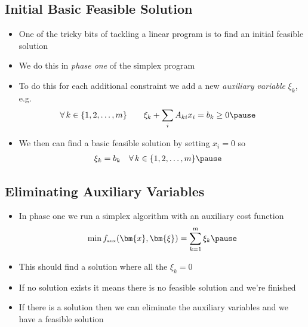 
\begin{slide}
\section[-2]{Initial Basic Feasible Solution}

\begin{PauseHighLight}
  \begin{itemize}
  \item One of the tricky bits of tackling a linear program is to find
    an initial feasible solution\pause
  \item We do this in \emph{phase one} of the simplex program\pause
  \item To do this for each additional constraint we add a new
    \emph{auxiliary variable} $\xi_k$, e.g.
    \begin{align*}
     \forall\, k\in\{1,2,\ldots, m\} \quad\quad
     \xi_k + \sum_i A_{ki} x_i &= b_k  \geq 0 \pause
    \end{align*}
  \item We then can find a basic feasible solution by setting $x_i=0$ so
    \begin{align*}
      \xi_k &= b_k  \quad \forall\, k\in\{1,2,\ldots, m\}\pause
    \end{align*}
  \end{itemize}
\end{PauseHighLight}

\end{slide}


\begin{slide}
\section{Eliminating Auxiliary Variables}

\begin{PauseHighLight}
  \begin{itemize}
  \item In phase one we run a simplex algorithm with an auxiliary cost
    function
    \begin{align*}
      \min f_{\text{\tiny aux}}(\bm{x},\bm{\xi}) = \sum_{k=1}^m \xi_k \pause
    \end{align*}
  \item This should find a solution where all the $\xi_k=0$\pause
  \item If no solution exists it means there is no feasible solution and
    we're finished\pause
  \item If there is a solution then we can eliminate the auxiliary
    variables and we have a feasible solution\pause
  \end{itemize}
\end{PauseHighLight}

\end{slide}

